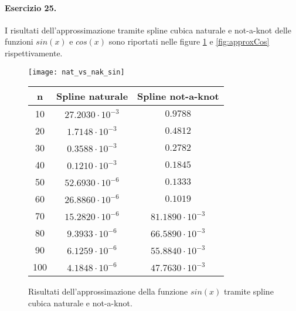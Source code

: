 \paragraph{Esercizio 25.} I risultati dell'approssimazione tramite spline cubica naturale e not-a-knot delle funzioni $sin(x)$ e $cos(x)$ sono riportati nelle figure \ref{fig:approxSin} e \ref{fig:approxCos} rispettivamente.
\begin{figure}
  \centering
  \texttt{[image: nat\_vs\_nak\_sin]}
  \begin{tabular}{|c|c|c|}
    \hline
    n & Spline naturale & Spline not-a-knot \\
    \hline\hline
    10 & $27.2030 \cdot 10^{-3}$ & $0.9788$ \\
    \hline
    20 & $1.7148 \cdot 10^{-3}$ & $0.4812$ \\
    \hline
    30 & $0.3588 \cdot 10^{-3}$ & $0.2782$ \\
    \hline
    40 & $0.1210 \cdot 10^{-3}$ & $0.1845$ \\
    \hline
    50 & $52.6930 \cdot 10^{-6}$ & $0.1333$ \\
    \hline
    60 & $26.8860 \cdot 10^{-6}$ & $0.1019$ \\
    \hline
    70 & $15.2820 \cdot 10^{-6}$ & $81.1890 \cdot 10^{-3}$ \\
    \hline
    80 & $9.3933 \cdot 10^{-6}$ & $66.5890 \cdot 10^{-3}$ \\
    \hline
    90 & $6.1259 \cdot 10^{-6}$ & $55.8840 \cdot 10^{-3}$ \\
    \hline
    100 & $4.1848 \cdot 10^{-6}$ & $47.7630 \cdot 10^{-3}$ \\
    \hline
  \end{tabular}
  \caption{Risultati dell'approssimazione della funzione $sin(x)$ tramite spline cubica naturale e not-a-knot.}
  \label{fig:approxSin}
\end{figure}

